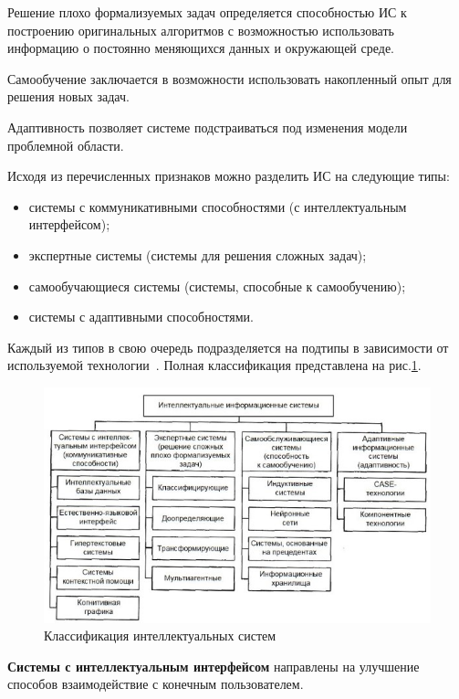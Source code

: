 Решение плохо формализуемых задач определяется способностью ИС к построению оригинальных алгоритмов с возможностью использовать информацию о постоянно меняющихся данных и окружающей среде.
    
Самообучение заключается в возможности использовать накопленный опыт для решения новых задач.
    
Адаптивность позволяет системе подстраиваться под изменения модели проблемной области.
    
Исходя из перечисленных признаков можно разделить ИС на следующие типы:
    
\begin{itemize}
	\item системы с коммуникативными способностями (с интеллектуальным интерфейсом);
	\item экспертные системы (системы для решения сложных задач);
	\item самообучающиеся системы (системы, способные к самообучению);
	\item системы с адаптивными способностями.
\end{itemize}

Каждый из типов в свою очередь подразделяется на подтипы в зависимости от используемой технологии~\cite{is1}. Полная классификация представлена на рис.\ref{fig:ISTypes}.

\begin{figure}[H]
	\centering
	\includegraphics[width=\linewidth]{fig/ISTypes.jpg}
	\caption{Классификация интеллектуальных систем}%
	\label{fig:ISTypes}
\end{figure}

\textbf{Системы с интеллектуальным интерфейсом} направлены на улучшение способов взаимодействие с конечным пользователем.

